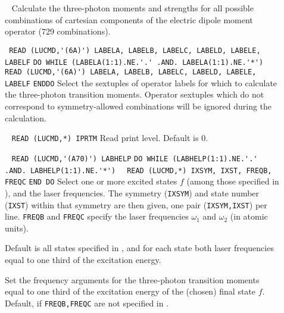 \begin{description}
\item[] \verb| |\newline
Calculate the three-photon moments and strengths for all possible combinations of cartesian 
components of the electric dipole moment operator (729 combinations).
\item[] \verb| |\newline
\verb|READ (LUCMD,'(6A)') LABELA, LABELB, LABELC, LABELD, LABELE, LABELF|\newline
\verb|DO WHILE (LABELA(1:1).NE.'.' .AND. LABELA(1:1).NE.'*')|\newline
\verb|   READ (LUCMD,'(6A)') LABELA, LABELB, LABELC, LABELD, LABELE, LABELF|\newline
\verb|ENDDO|\newline   
Select the sextuples of operator labels for which to calculate the three-photon transition
moments. Operator sextuples which do not correspond to symmetry-allowed combinations will be
ignored during the calculation.
\item[] \verb| |\newline
\verb|READ (LUCMD,*) IPRTM|\newline
Read print level. Default is 0.
\item[] \verb| | \newline
\verb|READ (LUCMD,'(A70)') LABHELP|\newline
\verb|DO WHILE (LABHELP(1:1).NE.'.' .AND. LABHELP(1:1).NE.'*')|\newline
\verb|  READ (LUCMD,*) IXSYM, IXST, FREQB, FREQC|\newline
\verb|END DO| \newline
Select one or more excited states $f$ (among those specified
in ), and the laser frequencies.
The symmetry (\verb+IXSYM+) and state number (\verb+IXST+)
within that symmetry are then given,
one pair (\verb|IXSYM,IXST|) per line.
\verb+FREQB+ and \verb+FREQC+ specify the 
laser frequencies $\omega_1$ and $\omega_2$ (in atomic units).


Default is all states specified in , and for each state
both laser frequencies equal to one third of the excitation energy.

%
\item[]
Set the frequency arguments for the three-photon transition moments
equal to one third of the excitation energy of the (chosen) 
final state $f$. Default, if \verb+FREQB,FREQC+ are not specified 
in .
%
\end{description}

